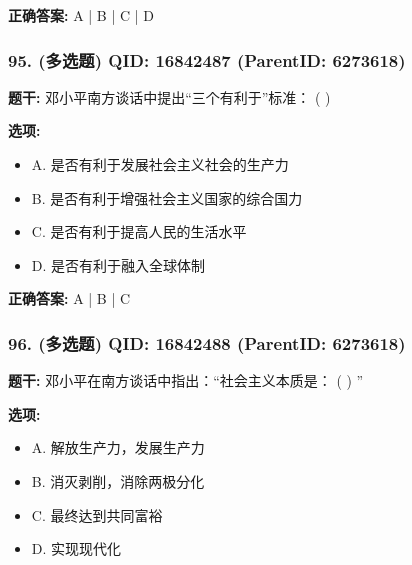 \documentclass[12pt,UTF8]{ctexart}
\begin{document}
\textbf{正确答案:}
A | B | C | D

\vspace{0.3em}\hrulefill\vspace{0.7em}

\subsubsection*{95. (多选题) \small QID: 16842487 (ParentID: 6273618)}

\textbf{题干:}
邓小平南方谈话中提出“三个有利于”标准： ( )



\textbf{选项:}
\begin{itemize}[leftmargin=*]

  \item A. 是否有利于发展社会主义社会的生产力

  \item B. 是否有利于增强社会主义国家的综合国力

  \item C. 是否有利于提高人民的生活水平

  \item D. 是否有利于融入全球体制

\end{itemize}

\textbf{正确答案:}
A | B | C

\vspace{0.3em}\hrulefill\vspace{0.7em}

\subsubsection*{96. (多选题) \small QID: 16842488 (ParentID: 6273618)}

\textbf{题干:}
邓小平在南方谈话中指出：“社会主义本质是： ( ) ”



\textbf{选项:}
\begin{itemize}[leftmargin=*]

  \item A. 解放生产力，发展生产力

  \item B. 消灭剥削，消除两极分化

  \item C. 最终达到共同富裕

  \item D. 实现现代化

\end{itemize}
\end{document}
